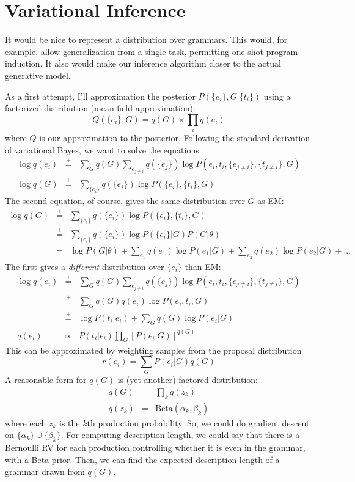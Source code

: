 \documentclass[12pt]{article}
\begin{document}
\section{Variational Inference}
It would be nice to represent a distribution over grammars.
This would, for example, allow generalization from a single task, permitting one-shot program induction.
It also would make our inference algorithm closer to the actual generative model.

As a first attempt, I'll approximation the posterior $P(\{e_i\},G | \{t_i\})$ using a factorized distribution (mean-field approximation):
$$
Q(\{e_i\},G) = q(G) \times \prod_i q(e_i) 
$$
where $Q$ is our approximation to the posterior.
Following the standard derivation of variational Bayes, we want to solve the equations
\begin{eqnarray*}
\log q(e_i) &\stackrel{+}{=}& \sum_G q(G)\sum_{e_{j\not= i}} q(\{e_j\}) \log P(e_i, t_i, \{e_{j\not= i}\}, \{t_{j\not= i}\}, G) \\
\log q(G) &\stackrel{+}{=}& \sum_{\{e_i\}} q(\{e_i\}) \log P(\{e_i\}, \{t_i\}, G )
\end{eqnarray*}
The second equation, of course, gives the same distribution over $G$ as EM:
\begin{eqnarray*}
\log q(G) &\stackrel{+}{=}& \sum_{\{e_i\}} q(\{e_i\}) \log P(\{e_i\}, \{t_i\}, G )\\
 &\stackrel{+}{=}& \sum_{\{e_i\}} q(\{e_i\}) \log P(\{e_i\} | G )P(G|\theta)\\
 &=& \log P(G|\theta) + \sum_{e_1} q(e_1)\log P(e_1 | G) + \sum_{e_2} q(e_2)\log P(e_2 | G)+...
\end{eqnarray*}
The first gives a \emph{different} distribution over $\{e_i\}$ than EM:
\begin{eqnarray*}
\log q(e_i) &\stackrel{+}{=}& \sum_G q(G)\sum_{e_{j\not= i}} q(\{e_j\}) \log P(e_i, t_i, \{e_{j\not= i}\}, \{t_{j\not= i}\}, G) \\
&\stackrel{+}{=}& \sum_G q(G) q(e_i) \log P(e_i, t_i, G) \\
&\stackrel{+}{=}& \log P(t_i | e_i) + \sum_G q(G) \log P(e_i | G) \\
q(e_i) &\propto& P(t_i | e_i) \prod_G \left[ P(e_i | G)\right]^{q(G)}
\end{eqnarray*}
This can be approximated by weighting samples from the proposal distribution
$$
r(e_i) = \sum_G P(e_i | G) q(G)
$$
A reasonable form for $q(G)$ is (yet another) factored distribution:
\begin{eqnarray*}
q(G) &=& \prod_k q(z_k)\\
q(z_k) &=& \mbox{Beta}(\alpha_k, \beta_k)
\end{eqnarray*}
where each $z_k$ is the $k$th production probability.
So, we could do gradient descent on  $\{\alpha_k\}\cup\{\beta_k\}$.
For computing description length, we could say that there is a Bernoulli RV for each production controlling whether it is even in the grammar, with a Beta prior.
Then, we can find the expected description length of a grammar drawn from $q(G)$.
\end{document}
